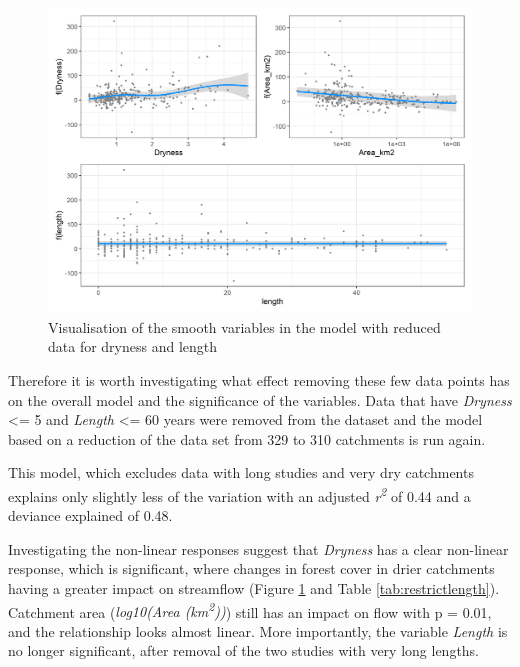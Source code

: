 \documentclass[]{elsarticle} %
\begin{document}
\begin{figure}
\includegraphics[width=0.9\linewidth]{model_redLength_smooths} \caption{Visualisation of the smooth variables in the model with reduced data for dryness and length}\label{fig:smoothsmodelredLength}
\end{figure}

Therefore it is worth investigating what effect removing these few data points has on the overall model and the significance of the variables. Data that have \emph{Dryness} \textless= 5 and \emph{Length} \textless= 60 years were removed from the dataset and the model based on a reduction of the data set from 329 to 310 catchments is run again.

This model, which excludes data with long studies and very dry catchments explains only slightly less of the variation with an adjusted \emph{r\textsuperscript{2}} of 0.44 and a deviance explained of 0.48.

Investigating the non-linear responses suggest that \emph{Dryness} has a clear non-linear response, which is significant, where changes in forest cover in drier catchments having a greater impact on streamflow (Figure \ref{fig:smoothsmodelredLength} and Table \ref{tab:restrictlength}). Catchment area (\emph{log10(Area (km\textsuperscript{2}))}) still has an impact on flow with p = 0.01, and the relationship looks almost linear. More importantly, the variable \emph{Length} is no longer significant, after removal of the two studies with very long lengths.
\end{document}
